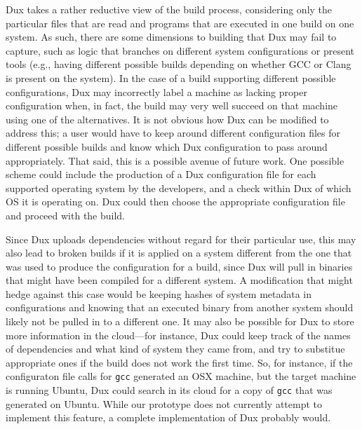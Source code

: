 \documentclass[10pt,conference]{IEEEtran}
\begin{document}
Dux takes a rather reductive view of the build process, considering only the particular files that are read
and programs that are executed in one build on one system. As such, there are some dimensions to building that
Dux may fail to capture, such as logic that branches on different system configurations or present tools (e.g.,
having different possible builds depending on whether GCC or Clang is present on the system). In the case of
a build supporting different possible configurations, Dux may incorrectly label a machine as lacking proper
configuration when, in fact, the build may very well succeed on that machine using one of the alternatives. 
It is not obvious how Dux can be modified to address this; a user would have to keep around different configuration 
files for different possible builds and know which Dux configuration to pass around appropriately. That said, this 
is a possible avenue of future work. One possible scheme could include the production of a Dux configuration 
file for each supported operating system by the developers, and a check within Dux of which OS it is operating 
on. Dux could then choose the appropriate configuration file and proceed with the build.

Since Dux uploads dependencies without regard for their particular use, this may also lead to broken builds 
if it is applied on a system different from the one that was used to produce the configuration for a build, 
since Dux will pull in binaries that might have been compiled for a different system. A modification that
might hedge against this case would be keeping hashes of system metadata in configurations and knowing
that an executed binary from another system should likely not be pulled in to a different one. It may also
be possible for Dux to store more information in the cloud---for instance, Dux could keep track of the names
of dependencies and what kind of system they came from, and try to substitue appropriate ones if the build does
not work the first time. So, for instance, if the configuraton file calls for \texttt{gcc} generated an OSX machine,
but the target machine is running Ubuntu, Dux could search in its cloud for a copy of \texttt{gcc} that was
generated on Ubuntu. While our prototype does not currently attempt to implement this feature, a complete
implementation of Dux probably would.
\end{document}
